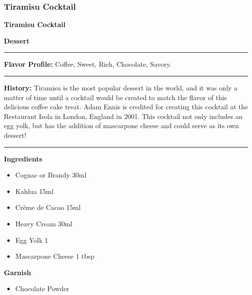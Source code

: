 \subsubsection{Tiramisu Cocktail}
\noindent
\begin{minipage}{.49\textwidth}
    \noindent\textbf{\LARGE Tiramisu Cocktail}
\end{minipage}
\hspace{.02\textwidth}
\begin{minipage}{.49\textwidth}
    \raggedleft
    \textbf{\large Dessert}\\
\end{minipage}
\vspace{.5em}\hrule\vspace{.5em}
\noindent
\textbf{\large Flavor Profile:} Coffee, Sweet, Rich, Chocolate, Savory.
\vspace{.5em}\hrule\vspace{.5em}
\noindent
\textbf{\large History:} Tiramisu is the most popular dessert in the world, and it was only a matter of time until a cocktail would be created to match the flavor of this delicious coffee cake treat. Adam Ennis is credited for creating this cocktail at the Restaurant Isola in London, England in 2001. This cocktail not only includes an egg yolk, but has the addition of mascarpone cheese and could serve as its own dessert!
\vspace{.5em}\hrule\vspace{.5em}
\noindent
\begin{minipage}[t]{.49\textwidth}
    \noindent
    \textbf{\large Ingredients}
    \begin{itemize}
        \item Cognac or Brandy 30ml
        \item Kahlua 15ml
        \item Crème de Cacao 15ml
        \item Heavy Cream 30ml
        \item Egg Yolk 1
        \item Mascarpone Cheese 1 tbsp
    \end{itemize}
    \noindent
    \textbf{\large Garnish}
    \begin{itemize}
        \item Chocolate Powder
    \end{itemize}
\end{minipage}
